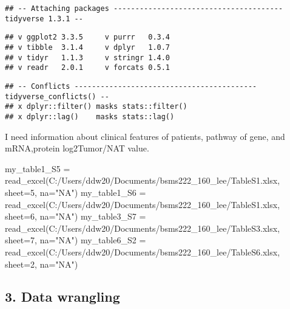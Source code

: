 \documentclass[
]{article}
\newenvironment{Shaded}{\begin{snugshade}}{\end{snugshade}}
\newcommand{\AttributeTok}[1]{\textcolor[rgb]{0.77,0.63,0.00}{#1}}
\newcommand{\DecValTok}[1]{\textcolor[rgb]{0.00,0.00,0.81}{#1}}
\newcommand{\FunctionTok}[1]{\textcolor[rgb]{0.00,0.00,0.00}{#1}}
\newcommand{\NormalTok}[1]{#1}
\newcommand{\OtherTok}[1]{\textcolor[rgb]{0.56,0.35,0.01}{#1}}
\newcommand{\StringTok}[1]{\textcolor[rgb]{0.31,0.60,0.02}{#1}}
\begin{document}
\begin{verbatim}
## -- Attaching packages --------------------------------------- tidyverse 1.3.1 --
\end{verbatim}

\begin{verbatim}
## v ggplot2 3.3.5     v purrr   0.3.4
## v tibble  3.1.4     v dplyr   1.0.7
## v tidyr   1.1.3     v stringr 1.4.0
## v readr   2.0.1     v forcats 0.5.1
\end{verbatim}

\begin{verbatim}
## -- Conflicts ------------------------------------------ tidyverse_conflicts() --
## x dplyr::filter() masks stats::filter()
## x dplyr::lag()    masks stats::lag()
\end{verbatim}

I need information about clinical features of patients, pathway of gene,
and mRNA,protein log2Tumor/NAT value.

\begin{Shaded}
\begin{Highlighting}[]
\NormalTok{my\_table1\_S5 }\OtherTok{=} \FunctionTok{read\_excel}\NormalTok{(}\StringTok{\textquotesingle{}C:/Users/ddw20/Documents/bsms222\_160\_lee/TableS1.xlsx\textquotesingle{}}\NormalTok{, }\AttributeTok{sheet=}\DecValTok{5}\NormalTok{, }\AttributeTok{na=}\StringTok{"NA"}\NormalTok{)}
\NormalTok{my\_table1\_S6 }\OtherTok{=} \FunctionTok{read\_excel}\NormalTok{(}\StringTok{\textquotesingle{}C:/Users/ddw20/Documents/bsms222\_160\_lee/TableS1.xlsx\textquotesingle{}}\NormalTok{, }\AttributeTok{sheet=}\DecValTok{6}\NormalTok{, }\AttributeTok{na=}\StringTok{"NA"}\NormalTok{)}
\NormalTok{my\_table3\_S7 }\OtherTok{=} \FunctionTok{read\_excel}\NormalTok{(}\StringTok{\textquotesingle{}C:/Users/ddw20/Documents/bsms222\_160\_lee/TableS3.xlsx\textquotesingle{}}\NormalTok{, }\AttributeTok{sheet=}\DecValTok{7}\NormalTok{, }\AttributeTok{na=}\StringTok{"NA"}\NormalTok{)}
\NormalTok{my\_table6\_S2 }\OtherTok{=} \FunctionTok{read\_excel}\NormalTok{(}\StringTok{\textquotesingle{}C:/Users/ddw20/Documents/bsms222\_160\_lee/TableS6.xlsx\textquotesingle{}}\NormalTok{, }\AttributeTok{sheet=}\DecValTok{2}\NormalTok{, }\AttributeTok{na=}\StringTok{"NA"}\NormalTok{)}
\end{Highlighting}
\end{Shaded}

\hypertarget{data-wrangling}{%
\subsection{3. Data wrangling}\label{data-wrangling}}
\end{document}
